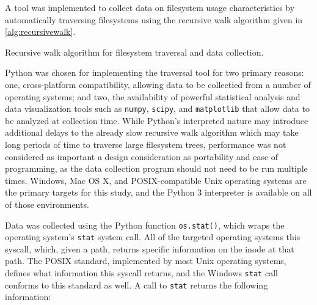 \documentclass[12pt,letterpaper]{article}
\begin{document}
			A tool was implemented to collect data on filesystem usage characteristics by automatically traversing filesystems using the recursive walk algorithm given in \cref{alg:recursivewalk}.
		
			\begin{algorithm}
				\caption{Recursive walk algorithm for filesystem traversal and data collection.}
				\label{alg:recursivewalk}
				\begin{algorithmic}[1]
			   		\State {}
			     	\State {}
			     	\EndIf
			   	\EndFor
				\EndProcedure
				\end{algorithmic}
			\end{algorithm}

			Python was chosen for implementing the traversal tool for two primary reasons: one, cross-platform compatibility, allowing data to be collectied from a number of operating systems; and two, the availability of powerful statistical analysis and data visualization tools such as \texttt{numpy}, \texttt{scipy}, and \texttt{matplotlib} that allow data to be analyzed at collection time. While Python's interpreted nature may introduce additional delays to the already slow recursive walk algorithm which may take long periods of time to traverse large filesystem trees, performance was not considered as important a design consideration as portability and ease of programming, as the data collection program should not need to be run multiple times. Windows, Mac OS X, and POSIX-compatible Unix operating systems are the primary targets for this study, and the Python 3 interpreter is available on all of those environments. 

			Data was collected using the Python function \texttt{os.stat()}, which wraps the operating system's \texttt{stat} system call. All of the targeted operating systems this syscall, which, given a path, returns specific information on the inode at that path. The POSIX standard, implemented by most Unix operating systems, defines what information this syscall returns, and the Windows \texttt{stat} call conforms to this standard as well. A call to \texttt{stat} returns the following information:
\end{document}
